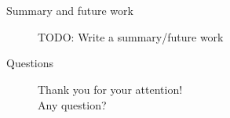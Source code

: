\documentclass[]{beamer}
\begin{document}
\section{}
\begin{frame}{Summary and future work}
    \begin{figure}[ht]
      \centering
      TODO: Write a summary/future work
  \end{figure}
\end{frame}

\begin{frame}{Questions}
  \begin{figure}[ht]
    \centering
    Thank you for your attention!\\
    Any question?
  \end{figure}
\end{frame}
\end{document}
